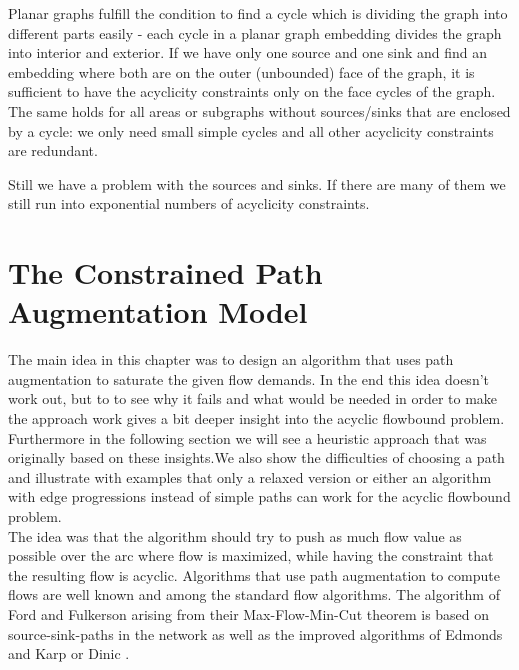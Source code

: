 Planar graphs fulfill the condition to find a 
cycle which is dividing the graph into different parts easily - each cycle in a planar graph embedding divides the 
graph into interior and exterior. If we have only one source and one sink and find an embedding where both are on the 
outer (unbounded) face of the graph, it is sufficient to have the acyclicity constraints only on the face cycles of the 
graph. The same holds for all areas or subgraphs without sources/sinks that are enclosed by a cycle: we only need small 
simple cycles and all other acyclicity constraints are redundant.

Still we have a problem with the sources and sinks. If there are many of them we still run into exponential numbers of 
acyclicity constraints.

\newpage
\section{The Constrained Path Augmentation Model}%
\label{model:pathaugment}
The main idea in this chapter was to design an algorithm that uses path augmentation to saturate the given flow 
demands. In the end this idea doesn't work out, but to to see why it fails and what would be needed in order to make 
the approach work gives a bit deeper insight into the acyclic flowbound problem. Furthermore in the following section 
we will see a heuristic approach that was originally based on these insights.We also show the difficulties of choosing a 
path and illustrate with examples that only a relaxed version or either an algorithm with edge progressions instead of 
simple paths can work for the acyclic flowbound problem.\\

The idea was that the algorithm should try to push as much flow value as possible over the arc where flow is 
maximized, while having the 
constraint that the resulting flow is acyclic. %
Algorithms that use path augmentation to compute flows are well known and among the standard flow algorithms. The 
algorithm of Ford and Fulkerson \cite{Ford-Fulkerson_algo} arising from their Max-Flow-Min-Cut theorem is based on 
source-sink-paths in the network as well as the improved algorithms of Edmonds and Karp \cite{EdmondsKarp1972} or Dinic 
\cite{Dinic1970}. 

